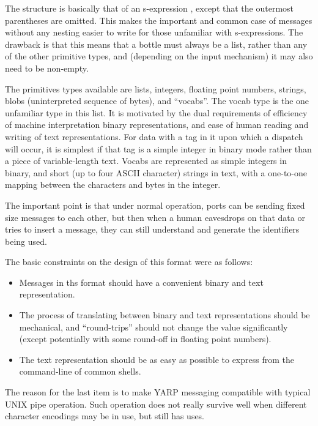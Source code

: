 The structure is basically that of an s-expression
\cite{rivest1997sexp}, except that the outermost parentheses are
omitted.  This makes the important and common case of messages without
any nesting easier to write for those unfamiliar with s-expressions.
The drawback is that this means that a bottle must always be a list,
rather than any of the other primitive types, and (depending on the
input mechanism) it may also need to be non-empty.

The primitives types available are lists, integers, floating point
numbers, strings, blobs (uninterpreted sequence of bytes), and
``vocabs''.  The vocab type is the one unfamiliar type in this list.
It is motivated by the dual requirements of efficiency of machine
interpretation binary representations, and ease of human reading and
writing of text representations.  For data with a tag in it upon which
a dispatch will occur, it is simplest if that tag is a simple integer
in binary mode rather than a piece of variable-length text.
Vocabs are represented as simple integers in binary, and short
(up to four ASCII character) strings in text, with a one-to-one
mapping between the characters and bytes in the integer.  


The important point is that under normal operation, ports can be
sending fixed size messages to each other, but then when a human
eavesdrops on that data or tries to insert a message, they can still
understand and generate the identifiers being used.


The basic constraints on the design of this format were as follows:

\begin{itemize} \pflist

\item Messages in ths format should have a convenient binary and text
representation.

\item The process of translating between binary and text
representations should be mechanical, and ``round-trips'' should not
change the value significantly (except potentially with some round-off
in floating point numbers).

\item The text representation should be as easy as possible
to express from the command-line of common shells.

\end{itemize}

The reason for the last item is to make YARP messaging compatible
with typical UNIX pipe operation.  Such operation does not 
really survive well when different character encodings may be
in use, but still has uses.




